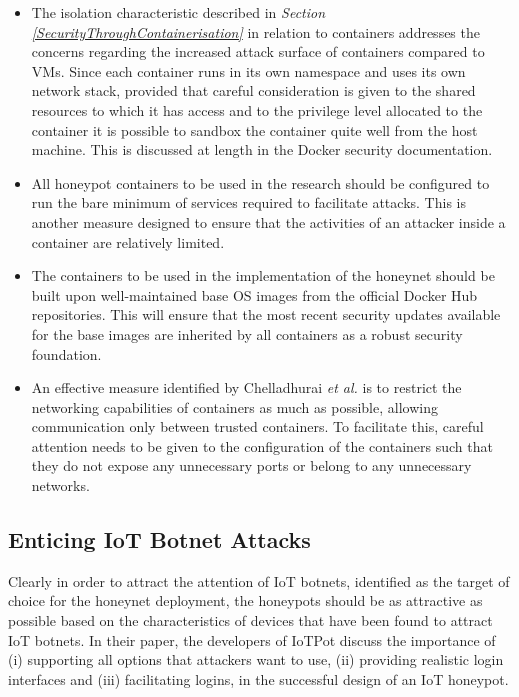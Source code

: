 \begin{itemize}
	\item The isolation characteristic described in \textit{Section \ref{SecurityThroughContainerisation}} in relation to containers addresses the concerns regarding the increased attack surface of containers compared to VMs. Since each container runs in its own namespace and uses its own network stack, provided that careful consideration is given to the shared resources to which it has access and to the privilege level allocated to the container it is possible to sandbox the container quite well from the host machine. This is discussed at length in the Docker security documentation. \cite{DockerSecurityDocumentation}
	\item All honeypot containers to be used in the research should be configured to run the bare minimum of services required to facilitate attacks. This is another measure designed to ensure that the activities of an attacker inside a container are relatively limited.
	\item The containers to be used in the implementation of the honeynet should be built upon well-maintained base OS images from the official Docker Hub repositories. \cite{DockerHub} This will ensure that the most recent security updates available for the base images are inherited by all containers as a robust security foundation.
	\item An effective measure identified by Chelladhurai \textit{et al.} \cite{Chelladhurai2016} is to restrict the networking capabilities of containers as much as possible, allowing communication only between trusted containers. To facilitate this, careful attention needs to be given to the configuration of the containers such that they do not expose any unnecessary ports or belong to any unnecessary networks.
\end{itemize}


\subsection{Enticing IoT Botnet Attacks}
Clearly in order to attract the attention of IoT botnets, identified as the target of choice for the honeynet deployment, the honeypots should be as attractive as possible based on the characteristics of devices that have been found to attract IoT botnets. \cite{UnderstandingTheMiraiBotnet} \cite{BrickerBotArticle} \cite{HajimeMysteriousBotnet} In their paper, the developers of IoTPot discuss the importance of (i) supporting all options that attackers want to use, (ii) providing realistic login interfaces and (iii) facilitating logins, in the successful design of an IoT honeypot. \cite{IoTPot2016}

